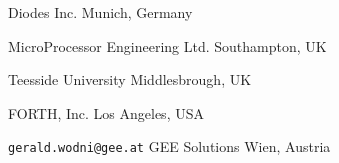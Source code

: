 	{}
	{Diodes Inc.}
	{Munich, Germany}

	{}
	{MicroProcessor Engineering Ltd.}
	{Southampton, UK}

	{}
	{Teesside University}
	{Middlesbrough, UK}



	{}
	{FORTH, Inc.}
	{Los Angeles, USA}

	{\texttt{gerald.wodni@gee.at}}
	{GEE Solutions}
	{Wien, Austria}
